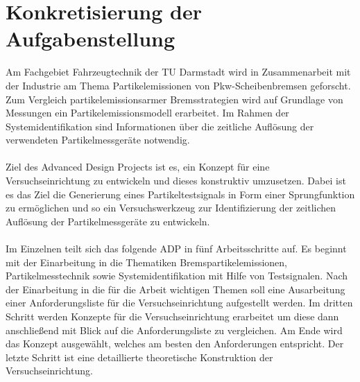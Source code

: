 \section{Konkretisierung der Aufgabenstellung}
Am Fachgebiet Fahrzeugtechnik der TU Darmstadt wird in Zusammenarbeit mit der Industrie am Thema Partikelemissionen von Pkw-Scheibenbremsen geforscht. Zum Vergleich partikelemissionsarmer Bremsstrategien wird auf Grundlage von Messungen ein Partikelemissionsmodell erarbeitet. Im Rahmen der Systemidentifikation sind Informationen \"{u}ber die zeitliche Aufl\"{o}sung der verwendeten Partikelmessger\"{a}te notwendig.
\\\\
Ziel des Advanced Design Projects ist es, ein Konzept f\"{u}r eine Versuchseinrichtung zu entwickeln und dieses konstruktiv umzusetzen. Dabei ist es das Ziel die Generierung eines Partikeltestsignals in Form einer Sprungfunktion zu erm\"{o}glichen und so ein Versuchswerkzeug zur Identifizierung der zeitlichen Aufl\"{o}sung der Partikelmessger\"{a}te zu entwickeln.
\\\\
Im Einzelnen teilt sich das folgende ADP in f\"{u}nf Arbeitsschritte auf. Es beginnt mit der Einarbeitung in die Thematiken Bremspartikelemissionen, Partikelmesstechnik sowie Systemidentifikation mit Hilfe von Testsignalen. Nach der Einarbeitung in die f\"{u}r die Arbeit wichtigen Themen soll eine Ausarbeitung einer Anforderungsliste f\"{u}r die Versuchseinrichtung aufgestellt werden. Im dritten Schritt werden Konzepte f\"{u}r die Versuchseinrichtung erarbeitet um diese dann anschlie{\ss}end mit Blick auf die Anforderungsliste zu vergleichen. Am Ende wird das Konzept ausgew\"{a}hlt, welches am besten den Anforderungen entspricht. Der letzte Schritt ist eine detaillierte theoretische Konstruktion der Versuchseinrichtung.